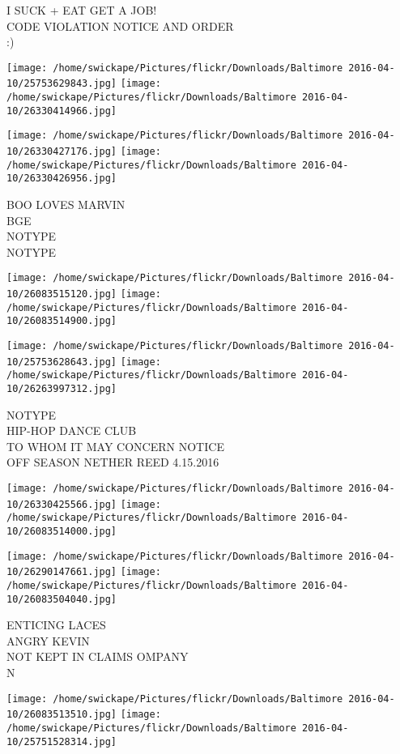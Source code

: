 \documentclass[10pt,letterpaper]{article}
\begin{document}
I SUCK + EAT GET A JOB!\\
CODE VIOLATION NOTICE AND ORDER\\
:)
\pagebreak

\texttt{[image: /home/swickape/Pictures/flickr/Downloads/Baltimore 2016-04-10/25753629843.jpg]}
\texttt{[image: /home/swickape/Pictures/flickr/Downloads/Baltimore 2016-04-10/26330414966.jpg]}

\texttt{[image: /home/swickape/Pictures/flickr/Downloads/Baltimore 2016-04-10/26330427176.jpg]}
\texttt{[image: /home/swickape/Pictures/flickr/Downloads/Baltimore 2016-04-10/26330426956.jpg]}

BOO LOVES MARVIN\\
BGE\\
NOTYPE\\
NOTYPE
\pagebreak

\texttt{[image: /home/swickape/Pictures/flickr/Downloads/Baltimore 2016-04-10/26083515120.jpg]}
\texttt{[image: /home/swickape/Pictures/flickr/Downloads/Baltimore 2016-04-10/26083514900.jpg]}

\texttt{[image: /home/swickape/Pictures/flickr/Downloads/Baltimore 2016-04-10/25753628643.jpg]}
\texttt{[image: /home/swickape/Pictures/flickr/Downloads/Baltimore 2016-04-10/26263997312.jpg]}

NOTYPE\\
HIP{-}HOP DANCE CLUB\\
TO WHOM IT MAY CONCERN NOTICE\\
OFF SEASON NETHER REED 4.15.2016
\pagebreak

\texttt{[image: /home/swickape/Pictures/flickr/Downloads/Baltimore 2016-04-10/26330425566.jpg]}
\texttt{[image: /home/swickape/Pictures/flickr/Downloads/Baltimore 2016-04-10/26083514000.jpg]}

\texttt{[image: /home/swickape/Pictures/flickr/Downloads/Baltimore 2016-04-10/26290147661.jpg]}
\texttt{[image: /home/swickape/Pictures/flickr/Downloads/Baltimore 2016-04-10/26083504040.jpg]}

ENTICING LACES\\
ANGRY KEVIN\\
NOT KEPT IN CLAIMS OMPANY\\
N
\pagebreak

\texttt{[image: /home/swickape/Pictures/flickr/Downloads/Baltimore 2016-04-10/26083513510.jpg]}
\texttt{[image: /home/swickape/Pictures/flickr/Downloads/Baltimore 2016-04-10/25751528314.jpg]}
\end{document}
